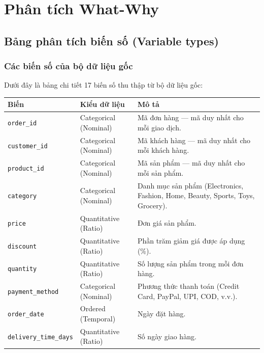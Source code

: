 \section{Phân tích What-Why}

\subsection{Bảng phân tích biến số (Variable types)}

\subsubsection{Các biến số của bộ dữ liệu gốc}

Dưới đây là bảng chi tiết 17 biến số thu thập từ bộ dữ liệu gốc:

\begin{table}[H]
\centering
\small
\renewcommand{\arraystretch}{1.2}
\begin{tabularx}{\textwidth}{|l|L{3.5cm}|X|}
    \hline
    \textbf{Biến} & \textbf{Kiểu dữ liệu} & \textbf{Mô tả} \\
    \hline
    \texttt{order\_id} & Categorical (Nominal) & Mã đơn hàng --- mã duy nhất cho mỗi giao dịch. \\
    \hline
    \texttt{customer\_id} & Categorical (Nominal) & Mã khách hàng --- mã duy nhất cho mỗi khách hàng. \\
    \hline
    \texttt{product\_id} & Categorical (Nominal) & Mã sản phẩm --- mã duy nhất cho mỗi sản phẩm. \\
    \hline
    \texttt{category} & Categorical (Nominal) & Danh mục sản phẩm (Electronics, Fashion, Home, Beauty, Sports, Toys, Grocery). \\
    \hline
    \texttt{price} & Quantitative (Ratio) & Đơn giá sản phẩm. \\
    \hline
    \texttt{discount} & Quantitative (Ratio) & Phần trăm giảm giá được áp dụng (\%). \\
    \hline
    \texttt{quantity} & Quantitative (Ratio) & Số lượng sản phẩm trong mỗi đơn hàng. \\
    \hline
    \texttt{payment\_method} & Categorical (Nominal) & Phương thức thanh toán (Credit Card, PayPal, UPI, COD, v.v.). \\
    \hline
    \texttt{order\_date} & Ordered (Temporal) & Ngày đặt hàng. \\
    \hline
    \texttt{delivery\_time\_days} & Quantitative (Ratio) & Số ngày giao hàng. \\
    \hline

\end{tabularx}
\end{table}
